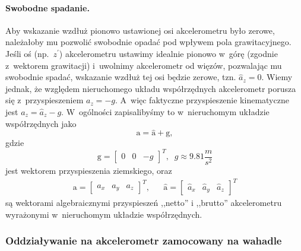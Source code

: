 \documentclass[paper=a4,DIV=12]{lpas}
\newcommand{\brm}[1]{\bm{\mathrm{#1}}}
\begin{document}
\begin{appendices}
\paragraph{Swobodne spadanie.}
Aby wskazanie wzdłuż pionowo ustawionej osi akcelerometru było zerowe,
należałoby mu pozwolić swobodnie opadać pod wpływem pola grawitacyjnego.
Jeśli oś (np.~$z^{\prime}$)  akcelerometru ustawimy idealnie pionowo w~górę
(zgodnie z~wektorem grawitacji) i~uwolnimy akcelerometr od więzów,
pozwalając mu swobodnie spadać, wskazanie wzdłuż tej osi będzie zerowe, tzn.
$\hat{a}_z =0$. Wiemy jednak, że względem nieruchomego układu współrzędnych
akcelerometr porusza się z~przyspieszeniem $a_z = -g$. A~więc faktyczne
przyspieszenie kinematyczne jest $a_z = \hat{a}_z - g$. W~ogólności
zapisalibyśmy to w~nieruchomym układzie współrzędnych jako
\begin{equation}
  \brm{a} = \hat{\brm{a}} + \brm{g},
  \label{eq:QDX8V}
\end{equation}
gdzie
\begin{equation}
  \brm{g} = \begin{bmatrix} 0 & 0 & -g \end{bmatrix}^T, \;\; g \approx 9.81 \frac{m}{s^2}
  \label{eq:PWKKB}
\end{equation}
jest wektorem przyspieszenia ziemskiego, oraz
\begin{align}
  & \brm{a} = \begin{bmatrix}
    a_x & a_y & a_z
  \end{bmatrix}^T, &
  & \hat{\brm{a}} = \begin{bmatrix}
    \hat{a}_x & \hat{a}_y & \hat{a}_z
  \end{bmatrix}^T &
  \label{eq:0JPXH}
\end{align}
są wektorami algebraicznymi przyspieszeń ,,netto'' i ,,brutto'' akcelerometru
wyrażonymi w~nieruchomym układzie współrzędnych.

\subsubsection{Oddziaływanie na akcelerometr zamocowany na wahadle}
\label{sec:JO17Z}


\end{appendices}
\end{document}
